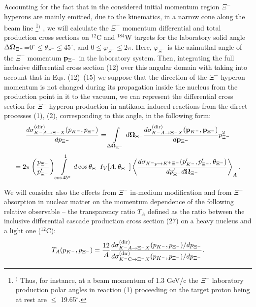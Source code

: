 \documentclass[12pt]{article}
\begin{document}
Accounting for the fact that in the considered initial momentum
region $\Xi^-$ hyperons are mainly emitted, due to the kinematics, in a narrow cone along the beam line
\footnote{$^)$ Thus, for instance, at a beam momentum of 1.3 GeV/c the $\Xi^-$ laboratory production
polar angles in reaction (1) proceeding on the target proton being at rest are $\le$ 19.65$^{\circ}$.}$^)$
,
we will calculate the $\Xi^-$ momentum
differential and total production cross sections on $^{12}$C and $^{184}$W targets
for the laboratory solid angle
${\Delta}{\bf \Omega}_{\Xi^-}$=$0^{\circ} \le \theta_{\Xi^-} \le 45^{\circ}$,
and $0 \le \varphi_{\Xi^-} \le 2{\pi}$.
Here, $\varphi_{\Xi^-}$ is the azimuthal angle of the $\Xi^-$ momentum ${\bf p}_{\Xi^-}$
in the laboratory system.
Then, integrating the full inclusive differential cross section (12) over this angular domain with
taking into account that in Eqs. (12)--(15) we suppose that the direction of the $\Xi^-$ hyperon momentum
is not changed during its propagation inside the nucleus from the production point in it to the vacuum,
we can represent the differential cross section for $\Xi^-$ hyperon
production in antikaon-induced reactions from the direct processes (1), (2),
corresponding to this angle, in the following form:
\begin{equation}
\frac{d\sigma_{{K^-}A\to {\Xi^-}X}^{({\rm dir})}
(p_{K^-},p_{\Xi^-})}{dp_{\Xi^-}}=
\int\limits_{{\Delta}{\bf \Omega}_{\Xi^-}}^{}d{\bf \Omega}_{\Xi^-}
\frac{d\sigma_{{K^-}A\to {\Xi^-}X}^{({\rm dir})}
({\bf p}_{K^-},{\bf p}_{\Xi^-})}{d{\bf p}_{\Xi^-}}p_{\Xi^-}^2
\end{equation}
$$
=2{\pi}\left(\frac{p_{\Xi^-}}{p^{\prime}_{\Xi^-}}\right)
\int\limits_{\cos45^{\circ}}^{1}d\cos{{\theta_{\Xi^-}}}I_{V}[A,\theta_{\Xi^-}]
\left<\frac{d\sigma_{{K^-}p\to {K^+}{\Xi^-}}(p^{\prime}_{K^-},
p^{\prime}_{\Xi^-},\theta_{\Xi^-})}{dp^{\prime}_{\Xi^-}d{\bf \Omega}_{\Xi^-}}\right>_A.
$$

We will consider also the effects from $\Xi^-$ in-medium modification and from $\Xi^-$ absorption in nuclear
matter on the momentum dependence of the following relative observable -- the transparency ratio $T_A$
defined as the ratio between the inclusive differential cascade production cross section (27) on a heavy
nucleus and a light one ($^{12}$C):
\begin{equation}
T_A(p_{K^-},p_{\Xi^-})=\frac{12}{A}\frac{d\sigma_{{K^-}A\to {\Xi^-}X}^{({\rm dir})}
(p_{K^-},p_{\Xi^-})/dp_{\Xi^-}}
{d\sigma_{{K^-}{\rm C}\to {\Xi^-}X}^{({\rm dir})}
(p_{K^-},p_{\Xi^-})/dp_{\Xi^-}}.
\end{equation}
\end{document}
